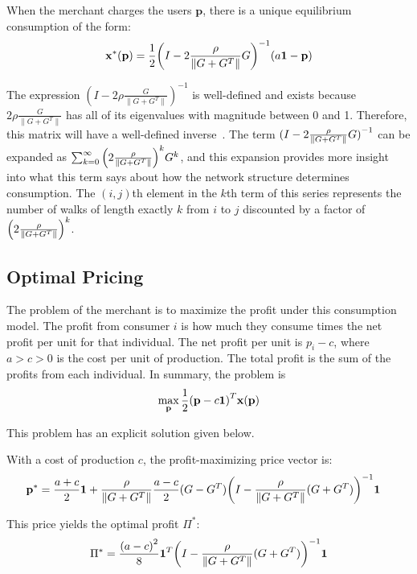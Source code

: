 \begin{proposition}
    When the merchant charges the users $\textbf{p}$, there is a unique equilibrium consumption of the form:
    \begin{equation}
        \mathbf{x}^*(\mathbf{p}) = \frac{1}{2} {\left(I - 2\frac{\rho}{\|G+G^T\|} G\right)}^{-1} (a\mathbf{1} - \mathbf{p}) 
    \end{equation}
\end{proposition}


The expression $ {\left( I - 2\rho\frac{G}{\|G + G^T\|}\right)}^{-1} $ is well-defined and exists because $2 \rho \frac{G}{\| G +G^T\|}$ has all of its eigenvalues with magnitude between 0 and 1. Therefore, this matrix will have a well-defined inverse~\cite{fan1949theorem}. The term ${(I - 2\frac{\rho}{\|G+G^T\|} G)}^{-1}$ can be expanded as $\sum_{k=0}^\infty {\left(2\frac{\rho}{\|G+G^T\|}\right)}^k G^k$, and this expansion provides more insight into what this term says about how the network structure determines consumption. The $(i,j)$th element in the $k$th term of this series represents the number of walks of length exactly $k$ from $i$ to $j$ discounted by a factor of ${\left(2 \frac{\rho}{\|G+G^T\|}\right)}^k$. 

\subsection{Optimal Pricing}
The problem of the merchant is to maximize the profit under this consumption model. The profit from consumer $i$ is how much they consume times the net profit per unit for that individual. The net profit per unit is $p_i - c$, where $a>c>0$ is the cost per unit of production. The total profit is the sum of the profits from each individual. In summary, the problem is 
\begin{equation}
    \max_{\mathbf{p}} \frac{1}{2} {(\mathbf{p} - c \mathbf{1} )}^T \mathbf{x} (\mathbf{p}) 
\end{equation}

This problem has an explicit solution given below. 
\begin{proposition}
    With a cost of production $c$, the profit-maximizing price vector is:
    \begin{align*}
        \bp^* &= %
         \frac{a+c}{2} \bo  + \rhof \frac{a-c}{2}  (G-G^T) {\left(I - \rhof (G+G^T)\right)}^{-1} \bo
    \end{align*}

    This price yields the optimal profit $\Pi^*$:
    \begin{equation}\label{eq:opt_prof}
        \Pi^* = \frac{{(a-c)}^2}{8} \mathbf{1}^T {\left(I - \frac{\rho}{\|G+G^T\|} (G+G^T) \right)}^{-1} \mathbf{1}
    \end{equation}
\end{proposition}


